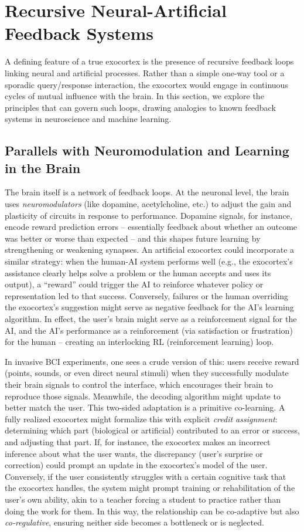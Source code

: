 \documentclass[11pt]{article}
\newcommand{\quotes}[1]{``#1''}
\begin{document}
\section{Recursive Neural-Artificial Feedback Systems}
A defining feature of a true exocortex is the presence of recursive feedback loops linking neural and artificial processes. Rather than a simple one-way tool or a sporadic query/response interaction, the exocortex would engage in continuous cycles of mutual influence with the brain. In this section, we explore the principles that can govern such loops, drawing analogies to known feedback systems in neuroscience and machine learning.

\subsection{Parallels with Neuromodulation and Learning in the Brain}
The brain itself is a network of feedback loops. At the neuronal level, the brain uses \textit{neuromodulators} (like dopamine, acetylcholine, etc.) to adjust the gain and plasticity of circuits in response to performance. Dopamine signals, for instance, encode reward prediction errors -- essentially feedback about whether an outcome was better or worse than expected -- and this shapes future learning by strengthening or weakening synapses. An artificial exocortex could incorporate a similar strategy: when the human-AI system performs well (e.g., the exocortex's assistance clearly helps solve a problem or the human accepts and uses its output), a \quotes{reward} could trigger the AI to reinforce whatever policy or representation led to that success. Conversely, failures or the human overriding the exocortex's suggestion might serve as negative feedback for the AI's learning algorithm. In effect, the user's brain might serve as a reinforcement signal for the AI, and the AI's performance as a reinforcement (via satisfaction or frustration) for the human -- creating an interlocking RL (reinforcement learning) loop.

In invasive BCI experiments, one sees a crude version of this: users receive reward (points, sounds, or even direct neural stimuli) when they successfully modulate their brain signals to control the interface, which encourages their brain to reproduce those signals. Meanwhile, the decoding algorithm might update to better match the user. This two-sided adaptation is a primitive co-learning. A fully realized exocortex might formalize this with explicit \textit{credit assignment}: determining which part (biological or artificial) contributed to an error or success, and adjusting that part. If, for instance, the exocortex makes an incorrect inference about what the user wants, the discrepancy (user's surprise or correction) could prompt an update in the exocortex's model of the user. Conversely, if the user consistently struggles with a certain cognitive task that the exocortex handles, the system might prompt training or rehabilitation of the user's own ability, akin to a teacher forcing a student to practice rather than doing the work for them. In this way, the relationship can be co-adaptive but also \textit{co-regulative}, ensuring neither side becomes a bottleneck or is neglected.
\end{document}
